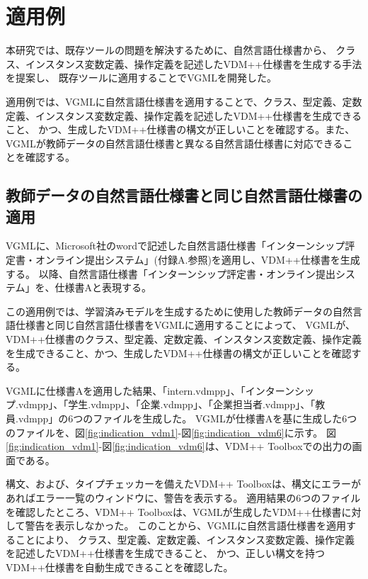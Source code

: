 \chapter{適用例}
\label{cha:Indication}

本研究では、既存ツールの問題を解決するために、自然言語仕様書から、
クラス、インスタンス変数定義、操作定義を記述したVDM++仕様書を生成する手法を提案し、
既存ツールに適用することでVGMLを開発した。

適用例では、VGMLに自然言語仕様書を適用することで、クラス、型定義、定数定義、インスタンス変数定義、操作定義を記述したVDM++仕様書を生成できること、
かつ、生成したVDM++仕様書の構文が正しいことを確認する。また、VGMLが教師データの自然言語仕様書と異なる自然言語仕様書に対応できることを確認する。

\section{教師データの自然言語仕様書と同じ自然言語仕様書の適用}
\label{sec:generate_vdm}

VGMLに、Microsoft社のwordで記述した自然言語仕様書「インターンシップ評定書・オンライン提出システム」(付録A.参照)を適用し、VDM++仕様書を生成する。
以降、自然言語仕様書「インターンシップ評定書・オンライン提出システム」を、仕様書Aと表現する。

この適用例では、学習済みモデルを生成するために使用した教師データの自然言語仕様書と同じ自然言語仕様書をVGMLに適用することによって、
VGMLが、VDM++仕様書のクラス、型定義、定数定義、インスタンス変数定義、操作定義を生成できること、かつ、生成したVDM++仕様書の構文が正しいことを確認する。

VGMLに仕様書Aを適用した結果、「intern.vdmpp」、「インターンシップ.vdmpp」、「学生.vdmpp」、「企業.vdmpp」、「企業担当者.vdmpp」、「教員.vdmpp」の6つのファイルを生成した。
VGMLが仕様書Aを基に生成した6つのファイルを、図\ref{fig:indication_vdm1}-図\ref{fig:indication_vdm6}に示す。
図\ref{fig:indication_vdm1}-図\ref{fig:indication_vdm6}は、VDM++ Toolbox\cite{Tools}での出力の画面である。

構文、および、タイプチェッカーを備えたVDM++ Toolboxは、構文にエラーがあればエラー一覧のウィンドウに、警告を表示する。
適用結果の6つのファイルを確認したところ、VDM++ Toolboxは、VGMLが生成したVDM++仕様書に対して警告を表示しなかった。
このことから、VGMLに自然言語仕様書を適用することにより、
クラス、型定義、定数定義、インスタンス変数定義、操作定義を記述したVDM++仕様書を生成できること、
かつ、正しい構文を持つVDM++仕様書を自動生成できることを確認した。

